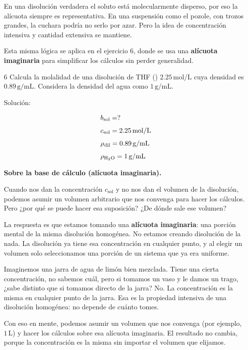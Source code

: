 \begin{notadidactica}
En una disolución verdadera el soluto está molecularmente disperso, por eso la 
alícuota siempre es representativa. En una suspensión como el pozole, con trozos 
grandes, la cuchara podría no serlo por azar. Pero la idea de concentración 
intensiva y cantidad extensiva se mantiene.

Esta misma lógica se aplica en el ejercicio 6, donde se usa una \textbf{alícuota 
imaginaria} para simplificar los cálculos sin perder generalidad.
\end{notadidactica}

\begin{exercise}{6}{}
Calcula la molalidad de una disolución de THF () 
$2.25\,\mathrm{mol/L}$ cuya densidad es $0.89\,\mathrm{g/mL}$. Considera la 
densidad del agua como $1\,\mathrm{g/mL}$.

Solución:

\begin{align*}
    &b_{\mathrm{sol}} = ? \\[4pt]
    &c_{\mathrm{sol}} = 2.25\,\mathrm{mol/L} \\[4pt]
    &\rho_{\mathrm{dil}} = 0.89\,\mathrm{g/mL} \\[4pt]
    &\rho_{\ce{H2O}} = 1\,\mathrm{g/mL}
\end{align*}

\begin{notaimportante}
\textbf{Sobre la base de cálculo (alícuota imaginaria).}

Cuando nos dan la concentración $c_{\mathrm{sol}}$ y no nos dan el volumen de 
la disolución, podemos asumir un volumen arbitrario que nos convenga para 
hacer los cálculos. Pero ¿por qué se puede hacer esa suposición? ¿De dónde 
sale ese volumen?

La respuesta es que estamos tomando una \textbf{alícuota imaginaria}: una 
porción mental de la misma disolución homogénea. No estamos creando disolución 
de la nada. La disolución ya tiene esa concentración en cualquier punto, y al 
elegir un volumen solo seleccionamos una porción de un sistema que ya era 
uniforme.

Imaginemos una jarra de agua de limón bien mezclada. Tiene una cierta 
concentración, no sabemos cuál, pero si tomamos un vaso y le damos un trago, 
¿sabe distinto que si tomamos directo de la jarra? No. La concentración es la 
misma en cualquier punto de la jarra. Esa es la propiedad intensiva de una 
disolución homogénea: no depende de cuánto tomes.

\medskip
Con eso en mente, podemos asumir un volumen que nos convenga (por ejemplo, 
$1\,\mathrm{L}$) y hacer los cálculos sobre esa alícuota imaginaria. El 
resultado no cambia, porque la concentración es la misma sin importar el 
volumen que elijamos.


\end{notaimportante}
\end{exercise}
